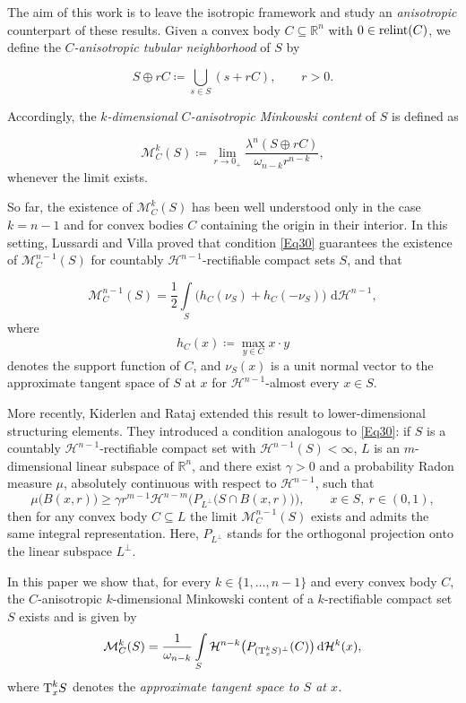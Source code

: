 \documentclass[pdflatex,sn-mathphys-num]{sn-jnl}
\theoremstyle{plain}
\theoremstyle{definition}
\DeclareMathOperator{\relint}{\textup{relint}}
\newcommand{\dH}[1]{\,\mathrm d\mathcal{H}^{#1}}
\begin{document}
The aim of this work is to leave the isotropic framework and study an \emph{anisotropic} counterpart of these results. Given a convex body $C\subseteq\mathbb{R}^n$ with $0\in\relint(C)$, we define the \emph{$C$-anisotropic tubular neighborhood} of $S$ by

$$S \oplus rC \coloneq \bigcup_{s\in S} (s+rC), \qquad r>0.$$

Accordingly, the \emph{$k$-dimensional $C$-anisotropic Minkowski content} of $S$ is defined as

$$\mathcal{M}^k_C(S) \coloneq 
\lim_{r\to0_+}\frac{\lambda^n(S\oplus rC)}{\omega_{n-k} r^{n-k}},$$ whenever the limit exists.

So far, the existence of $\mathcal{M}^k_C(S)$ has been well understood only in the case $k=n-1$ and for convex bodies $C$ containing the origin in their interior. In this setting, Lussardi and Villa \cite[Theorem 3.4]{Villa2} proved that condition \eqref{Eq30} guarantees the existence of $\mathcal{M}^{n-1}_C(S)$ for countably $\mathcal{H}^{n-1}$-rectifiable compact sets $S$, and that

$$\mathcal{M}^{n-1}_C(S)
=
\frac12 \int\limits_S \bigl(h_C(\nu_S)+h_C(-\nu_S)\bigr)\,\dH{n-1},$$
where
$$h_C(x)\coloneq \max_{y\in C} x\cdot y$$
denotes the support function of $C$, and $\nu_S(x)$ is a unit normal vector to the approximate tangent space of $S$ at $x$ for $\mathcal{H}^{n-1}$-almost every $x\in S$.

More recently, Kiderlen and Rataj \cite[Theorem 8]{Rataj5} extended this result to lower-dimensional structuring elements. They introduced a condition analogous to \eqref{Eq30}: if $S$ is a countably $\mathcal{H}^{n-1}$-rectifiable compact set with $\mathcal{H}^{n-1}(S)<\infty$, $L$ is an $m$-dimensional linear subspace of $\mathbb{R}^n$, and there exist $\gamma>0$ and a probability Radon measure $\mu$, absolutely continuous with respect to $\mathcal{H}^{n-1}$, such that
\begin{equation}\label{Eq31}
\mu\big(B(x,r)\big) \geq \gamma r^{m-1}\mathcal{H}^{n-m}\Big(P_{L^\perp}\big(S\cap B(x,r)\big)\Big),
\qquad x\in S,\ r\in(0,1),
\end{equation}
then for any convex body $C\subseteq L$ the limit $\mathcal{M}^{n-1}_C(S)$ exists and admits the same integral representation. Here, $P_{L^{\perp}}$ stands for the orthogonal projection onto the linear subspace $L^{\perp}$.

\medskip

In this paper we show that, for every $k\in\{1, \dots, n-1\}$ and every convex body $C$, the $C$-anisotropic $k$-dimensional Minkowski content of a $k$-rectifiable compact set $S$ exists and is given by
\begin{equation}\label{Eq40}
\mathcal{M}^k_C(S)
=
\frac{1}{\omega_{n-k}}
\int\limits_S \mathcal{H}^{n-k}\big(P_{(\textup{T}^k_xS)^{\perp}}(C)\big)\dH{k}(x),
\end{equation}
where $\textup{T}^k_xS$ denotes the \emph{approximate tangent space to $S$ at $x$.}
\end{document}
